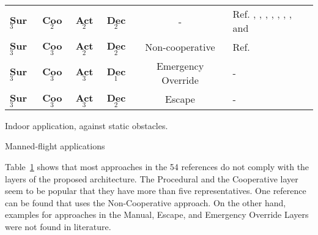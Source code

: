 \begin{table}[h]
\begin{center}
\begin{tabular}{lccccl}
        \textbf{Sur}$_3$ & \textbf{Coo}$_2$ & \textbf{Act}$_2$  & \textbf{Dec}$_2$ & - & Ref. \cite{Kitamura:95}, \cite{Yang:04}, \cite{Wang:07}, \cite{Fasano:08}, \cite{Prevost:11}, \cite{Choi:13}, \cite{Klaus:13}, and \cite{Schmitt:14} \\
        \textbf{Sur}$_3$ & \textbf{Coo}$_3$ & \textbf{Act}$_2$  & \textbf{Dec}$_2$ & Non-cooperative & Ref.~\cite{Rathbun:02} \\
        \textbf{Sur}$_3$ & \textbf{Coo}$_3$ & \textbf{Act}$_3$  & \textbf{Dec}$_1$ & Emergency Override & - \\  
        \textbf{Sur}$_3$ & \textbf{Coo}$_3$ & \textbf{Act}$_3$  & \textbf{Dec}$_2$ & Escape & -  \\ 
       \hline 
   \end{tabular} 
   \begin{tablenotes}
    \item[\dag] Indoor application, against static obstacles.
    \item[\ddag] Manned-flight applications
    \end{tablenotes}
  \label{t:SurvivedApproaches}
 \end{center}
\end{table}

Table~\ref{t:SurvivedApproaches} shows that most approaches in the 54 references do not comply with the layers of the proposed architecture. The Procedural and the Cooperative layer seem to be popular that they have more than five representatives. One reference can be found that uses the Non-Cooperative approach. On the other hand, examples for approaches in the Manual, Escape, and Emergency Override Layers were not found in literature.

